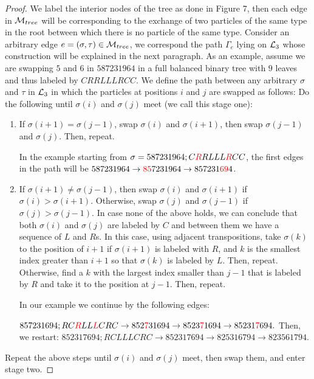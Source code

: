 \documentclass[10 pt]{article}
\newcommand{\M}{{\cal M}}
\newcommand{\Lc}{{\cal L}_3}
\begin{document}
\begin{proof}

We label the interior nodes of the tree as done in Figure 7, then each edge in $\M_{tree}$ will be corresponding to the exchange
of two particles of the same type in the root between which there is no particle of the same type.
Consider an arbitrary edge $e=(\sigma,\tau)\in \M_{tree}$, we correspond the path $\Gamma_{e}$ lying on $\Lc$
whose construction will be explained in the next paragraph. As an example,  assume we are swapping $5$ and $6$ in $587231964$
in a full balanced binary tree with $9$ leaves and thus labeled by $CRRLLLRCC$. We  define the path between any arbitrary
$\sigma$ and $\tau$ in $\Lc$ in which the particles at positions $i$ and $j$ are swapped as follows: 
Do the following until $\sigma(i)$ and $\sigma(j)$ meet (we call this stage one):
\begin{enumerate}
\item If $\sigma(i+1)=\sigma(j-1)$, swap $\sigma(i)$ and $\sigma(i+1)$, then swap $\sigma(j-1)$ and $\sigma(j)$. Then, repeat. 

In the example starting from $\sigma=587231964; C{\color{red}R}RLLL{\color{red}R}CC$, the first edges in the path will be
$587231964\rightarrow {\color{red}85}7231964\rightarrow 857231{\color{red}69}4$. 
\item If $\sigma(i+1)\neq \sigma(j-1)$, then swap $\sigma(i)$ and $\sigma(i+1)$ if  $\sigma(i) > \sigma(i+1)$.
Otherwise, swap $\sigma(j)$ and $\sigma(j-1)$ if  $\sigma(j) > \sigma(j-1)$. In case none of the above holds,
we can conclude that both $\sigma(i)$ and $\sigma(j)$ are labeled by $C$ and between them we have a sequence of $L$ and $R$s.
In this case, using adjacent transpositions, take   $\sigma(k)$ to the position of $i+1$ if $\sigma(i+1)$ is labeled with $R$,
and $k$ is the smallest index greater than $i+1$ so that $\sigma(k)$ is labeled by $L$. Then, repeat. Otherwise, find a $k$
with the largest index smaller than $j-1$ that is labeled by $R$ and take it to the position at $j-1$. Then, repeat. 

In our example we continue by the following edges: 

$857231694 ;R C{\color{red}R}LL{\color{red}L}CRC \rightarrow 852{\color{red}7}31694 \rightarrow 8523{\color{red}7}1694 
\rightarrow 85231{\color{red}7}694.  $
Then, we restart: $852317694; R CLLLCRC \rightarrow 852317694    \rightarrow 825316794  \rightarrow 823561794  $.
\end{enumerate}

Repeat the above steps until $\sigma(i)$ and $\sigma(j)$ meet, then swap them, and enter stage two.


\end{proof}
\end{document}

